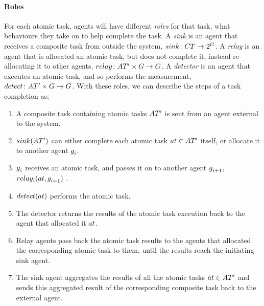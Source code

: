 \paragraph{Roles}
\label{section:roles}

\newcommand{\formalSinkRole}[2]{
	\functionFormal{sink}
	{\setCompositeTask{}{}}
	{\powerSetAgents}{}{}
}
\newcommand{\functionSinkRole}[2]{
	\functionSignature{sink}
	{\setAtomicTaskInstance{#1}{}}
}
\newcommand{\functionSinkRoleAtomic}[2]{
	\functionSignature{sink}
	{\lbrace\varAtomicTask{#1}{}\rbrace}
}

\newcommand{\formalDetectorRole}[2]{
	\functionFormal{detect}{\setAtomicTaskInstance{}{} \times \setAgent{}{}}{ \setAgent{}{}}
}
\newcommand{\functionDetectorRole}[2]{
	\functionSignature{detect}{\varAtomicTask{#1}{#2}}
}

\newcommand{\formalRelayRole}[2]{
	\functionFormal{relay}{\setAtomicTaskInstance{}{} \times \setAgent{}{}}{ \setAgent{}{}}
}
\newcommand{\functionRelayRole}[2]{
	\functionSignature{relay_{#1}}{\varAtomicTask{}{}, \varAgent{#2}{}}
}



For each atomic task, agents will have different \textit{roles} for that task,  what behaviours they take on to help complete the task. A \textit{sink} is an agent that  receives a composite task from outside the system, $\formalSinkRole{}{}$. A \textit{relay} is an agent that is allocated an atomic task, but does not complete it, instead re-allocating it to other agents, $\formalRelayRole{}{}$. A \textit{detector} is an agent that  executes an atomic task, and so performs the measurement, $\formalDetectorRole{}{}$. With these roles, we can describe the steps of a task completion as;
\begin{enumerate}
	\item A composite task containing atomic tasks $\setAtomicTaskInstance{}{}$ is sent from an agent external to the system.
	\item $\functionSinkRole{}{}$ can either complete each atomic task $
	\varAtomicTask{}{} \in \setAtomicTaskInstance{}{}$ itself, or allocate it to another agent $g_{i}^{}$.
	 \item $g_{i}^{}$ receives an atomic task, and passes it on to another agent $g_{i+1}^{}$, $\functionRelayRole{i}{i+1}$ .
	 \item $\functionDetectorRole{}{}$ performs the atomic task.
	 \item The detector returns the results of the atomic task execution back to the agent that allocated it $\varAtomicTask{}{}$.
	 \item Relay agents pass back the atomic task results to the agents that allocated the corresponding atomic task to them, until the results reach the initiating sink agent.
	 \item The sink agent aggregates the results of all the atomic tasks $ \varAtomicTask{}{} \in \setAtomicTaskInstance{}{}$ and sends this aggregated result of the corresponding composite task back to the external agent.
\end{enumerate}

